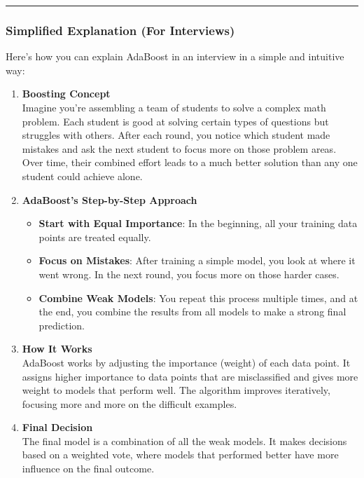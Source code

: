 \documentclass[12pt]{book}
\providecommand{\tightlist}{%
  \setlength{\itemsep}{0pt}\setlength{\parskip}{0pt}}
\begin{document}
\begin{center}\rule{0.5\linewidth}{0.5pt}\end{center}

\subsubsection{Simplified Explanation (For
Interviews)}\label{simplified-explanation-for-interviews}

Here's how you can explain AdaBoost in an interview in a simple and
intuitive way:

\begin{enumerate}
\def\labelenumi{\arabic{enumi}.}
\item
  \textbf{Boosting Concept}\\
  Imagine you're assembling a team of students to solve a complex math
  problem. Each student is good at solving certain types of questions
  but struggles with others. After each round, you notice which student
  made mistakes and ask the next student to focus more on those problem
  areas. Over time, their combined effort leads to a much better
  solution than any one student could achieve alone.
\item
  \textbf{AdaBoost's Step-by-Step Approach}

  \begin{itemize}
  \tightlist
  \item
    \textbf{Start with Equal Importance}: In the beginning, all your
    training data points are treated equally.
  \item
    \textbf{Focus on Mistakes}: After training a simple model, you look
    at where it went wrong. In the next round, you focus more on those
    harder cases.
  \item
    \textbf{Combine Weak Models}: You repeat this process multiple
    times, and at the end, you combine the results from all models to
    make a strong final prediction.
  \end{itemize}
\item
  \textbf{How It Works}\\
  AdaBoost works by adjusting the importance (weight) of each data
  point. It assigns higher importance to data points that are
  misclassified and gives more weight to models that perform well. The
  algorithm improves iteratively, focusing more and more on the
  difficult examples.
\item
  \textbf{Final Decision}\\
  The final model is a combination of all the weak models. It makes
  decisions based on a weighted vote, where models that performed better
  have more influence on the final outcome.
\end{enumerate}
\end{document}
